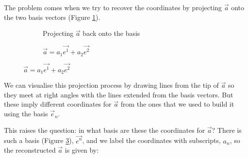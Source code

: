 The problem comes when we try to recover the coordinates by projecting $\vec{a}$ onto the two basis vectors (Figure \ref{fig:vectors-non-orth-3}).

\begin{figure}[h]
    \caption{Projecting a vector onto a carelessly chosen basis}
    \begin{subfigure}{0.5\textwidth}
        \centering
    \caption{Projecting $\vec{a}$ back onto the basis} \label{fig:vectors-non-orth-3}
    \end{subfigure}
    \begin{subfigure}{0.5\textwidth}
        \centering
        \caption{$\vec{a} = a_1 \vec{e^1} + a_2 \vec{e^2}$} \label{fig:vectors-non-orth-4}
    \end{subfigure}
\end{figure}

We can visualise this projection process by drawing lines from the tip of $\vec{a}$ so they meet at right angles with the lines extended from the basis vectors. But these imply different coordinates for $\vec{a}$ from the ones that we used to build it using the basis $\vec{e}_n$.

This raises the question: in what basis are these the coordinates for $\vec{a}$? There is such a basis (Figure \ref{fig:vectors-non-orth-4}), $\vec{e^n}$, and we label the coordinates with subscripts, $a_n$, so the reconstructed $\vec{a}$ is given by:

